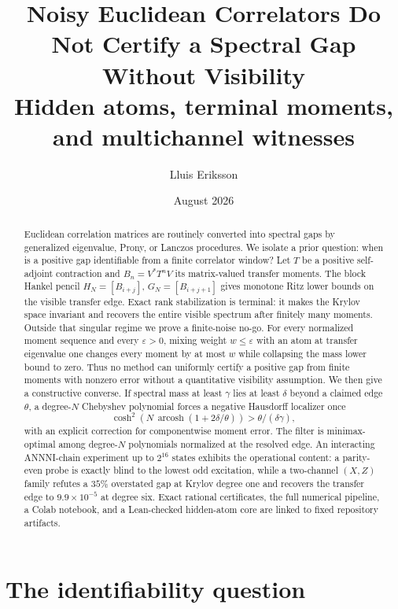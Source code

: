 \documentclass[11pt]{article}
\title{\bfseries Noisy Euclidean Correlators Do Not Certify a Spectral Gap Without Visibility\\[3pt]
\large Hidden atoms, terminal moments, and multichannel witnesses}
\author{Lluis Eriksson}
\date{August 2026}
\theoremstyle{definition}
\theoremstyle{remark}
\newcommand{\eps}{\varepsilon}
\begin{document}
\maketitle

\begin{abstract}
Euclidean correlation matrices are routinely converted into spectral gaps by
generalized eigenvalue, Prony, or Lanczos procedures.  We isolate a prior
question: when is a positive gap identifiable from a finite correlator window?
Let $T$ be a positive self-adjoint contraction and
$B_n=V^*T^nV$ its matrix-valued transfer moments.  The block Hankel pencil
$H_N=[B_{i+j}]$, $G_N=[B_{i+j+1}]$ gives monotone Ritz lower bounds on the
visible transfer edge.  Exact rank stabilization is terminal: it makes the
Krylov space invariant and recovers the entire visible spectrum after finitely
many moments.  Outside that singular regime we prove a finite-noise no-go.
For every normalized moment sequence and every $\eps>0$, mixing weight
$w\leq\eps$ with an atom at transfer eigenvalue one changes every moment by at
most $w$ while collapsing the mass lower bound to zero.  Thus no method can
uniformly certify a positive gap from finite moments with nonzero error without
a quantitative visibility assumption.  We then give a constructive converse.
If spectral mass at least $\gamma$ lies at least $\delta$ beyond a claimed edge
$\theta$, a degree-$N$ Chebyshev polynomial forces a negative Hausdorff
localizer once
\[
 \cosh^2\!\left(N\,\operatorname{arcosh}
 (1+2\delta/\theta)\right)>\theta/(\delta\gamma),
\]
with an explicit correction for componentwise moment error.  The filter is
minimax-optimal among degree-$N$ polynomials normalized at the resolved edge.
An interacting
ANNNI-chain experiment up to $2^{16}$ states exhibits the operational content:
a parity-even probe is exactly blind to the lowest odd excitation, while a
two-channel $(X,Z)$ family refutes a $35\%$ overstated gap at Krylov degree one
and recovers the transfer edge to $9.9\times10^{-5}$ at degree six.  Exact
rational certificates, the full numerical pipeline, a Colab notebook, and a
Lean-checked hidden-atom core are linked to fixed repository artifacts.
\end{abstract}

\section{The identifiability question}
\end{document}
